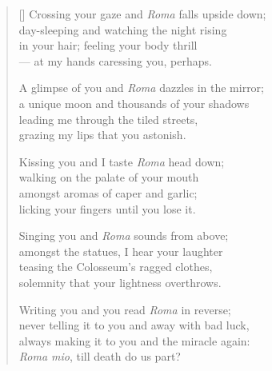 \documentclass[a4paper,11pt]{article}
\begin{document}
\thispagestyle{empty}


\settowidth{\versewidth}{always making it to you and the miracle again,}

\bigskip

\begin{verse}[\versewidth]
  Crossing your gaze and \emph{Roma} falls upside down; \\
  day-sleeping and watching the night rising \\
  in your hair; feeling your body thrill \\
  --- at my hands caressing you, perhaps.

  A glimpse of you and \emph{Roma} dazzles in the mirror; \\
  a unique moon and thousands of your shadows \\
  leading me through the tiled streets, \\
  grazing my lips that you astonish.

  Kissing you and I taste \emph{Roma} head down; \\
  walking on the palate of your mouth \\
  amongst aromas of caper and garlic; \\
  licking your fingers until you lose it.

  Singing you and \emph{Roma} sounds from above; \\
  amongst the statues, I hear your laughter \\
  teasing the Colosseum's ragged clothes, \\
  solemnity that your lightness overthrows.

  Writing you and you read \emph{Roma} in reverse; \\
  never telling it to you and away with bad luck, \\
  always making it to you and the miracle again: \\
  \emph{Roma mio}, till death do us part?
\end{verse}
\end{document}
